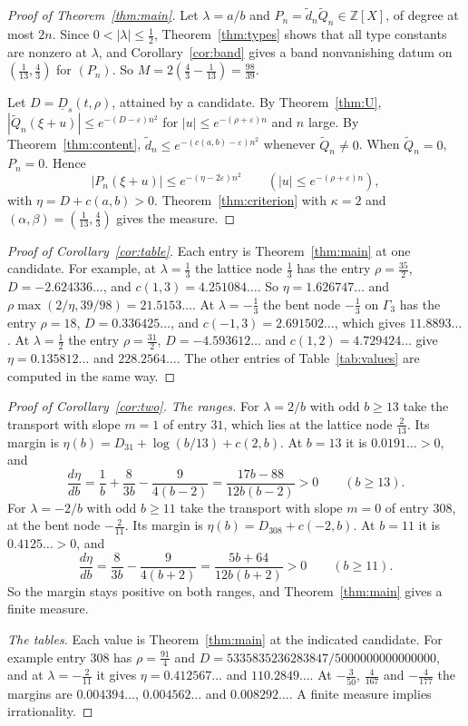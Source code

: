\documentclass[11pt]{amsart}
\theoremstyle{definition}
\theoremstyle{remark}
\numberwithin{equation}{section}
\newcommand{\Z}{\mathbb Z}
\newcommand{\Dlow}{\underline{D}}
\begin{document}
\begin{proof}[Proof of Theorem~\ref{thm:main}]
Let $\lambda=a/b$ and $P_n=\tilde d_n\tilde Q_n\in\Z[X]$, of degree at most $2n$. Since $0<|\lambda|\le\frac12$, Theorem~\ref{thm:types}
shows that all type constants are nonzero at $\lambda$, and Corollary~\ref{cor:band} gives a band nonvanishing datum on
$(\frac1{13},\frac43)$ for $(P_n)$. So $M=2(\frac43-\frac1{13})=\frac{98}{39}$.

Let $D=\Dlow_s(t,\rho)$, attained by a candidate. By Theorem~\ref{thm:U}, $|\tilde Q_n(\xi+u)|\le e^{-(D-\varepsilon)n^2}$
for $|u|\le e^{-(\rho+\varepsilon)n}$ and $n$ large. By Theorem~\ref{thm:content}, $\tilde d_n\le e^{-(c(a,b)-\varepsilon)n^2}$
whenever $\tilde Q_n\ne0$. When $\tilde Q_n=0$, $P_n=0$. Hence
\[
 |P_n(\xi+u)|\le e^{-(\eta-2\varepsilon)n^2}\qquad(|u|\le e^{-(\rho+\varepsilon)n}),
\]
with $\eta=D+c(a,b)>0$. Theorem~\ref{thm:criterion} with $\kappa=2$ and $(\alpha,\beta)=(\frac1{13},\frac43)$ gives the
measure.
\end{proof}

\begin{proof}[Proof of Corollary~\ref{cor:table}]
Each entry is Theorem~\ref{thm:main} at one candidate. For example, at $\lambda=\frac13$ the lattice node $\frac13$ has
the entry $\rho=\frac{35}2$, $D=-2.624336\ldots$, and $c(1,3)=4.251084\ldots$. So $\eta=1.626747\ldots$ and
$\rho\max(2/\eta,39/98)=21.5153\ldots$. At $\lambda=-\frac13$ the bent node $-\frac13$ on $\Gamma_3$ has the entry
$\rho=18$, $D=0.336425\ldots$, and $c(-1,3)=2.691502\ldots$, which gives $11.8893\ldots$. At $\lambda=\frac12$ the entry
$\rho=\frac{31}2$, $D=-4.593612\ldots$ and $c(1,2)=4.729424\ldots$ give $\eta=0.135812\ldots$ and $228.2564\ldots$.
The other entries of Table~\ref{tab:values} are computed in the same way.
\end{proof}

\begin{proof}[Proof of Corollary~\ref{cor:two}]
\emph{The ranges.} For $\lambda=2/b$ with odd $b\ge13$ take the transport with slope $m=1$ of entry $31$, which lies at
the lattice node $\frac2{13}$. Its margin is $\eta(b)=D_{31}+\log(b/13)+c(2,b)$. At $b=13$ it is $0.0191\ldots>0$, and
\[
 \frac{d\eta}{db}=\frac1b+\frac8{3b}-\frac9{4(b-2)}=\frac{17b-88}{12b(b-2)}>0\qquad(b\ge13).
\]
For $\lambda=-2/b$ with odd $b\ge11$ take the transport with slope $m=0$ of entry $308$, at the bent node
$-\frac2{11}$. Its margin is $\eta(b)=D_{308}+c(-2,b)$. At $b=11$ it is $0.4125\ldots>0$, and
\[
 \frac{d\eta}{db}=\frac8{3b}-\frac9{4(b+2)}=\frac{5b+64}{12b(b+2)}>0\qquad(b\ge11).
\]
So the margin stays positive on both ranges, and Theorem~\ref{thm:main} gives a finite measure.

\emph{The tables.} Each value is Theorem~\ref{thm:main} at the indicated candidate. For example entry $308$ has
$\rho=\frac{91}4$ and $D=5335835236283847/5000000000000000$, and at $\lambda=-\frac2{11}$ it gives
$\eta=0.412567\ldots$ and $110.2849\ldots$. At $-\frac3{50}$, $\frac4{167}$ and $-\frac4{177}$ the margins are
$0.004394\ldots$, $0.004562\ldots$ and $0.008292\ldots$. A finite measure implies irrationality.
\end{proof}
\end{document}
